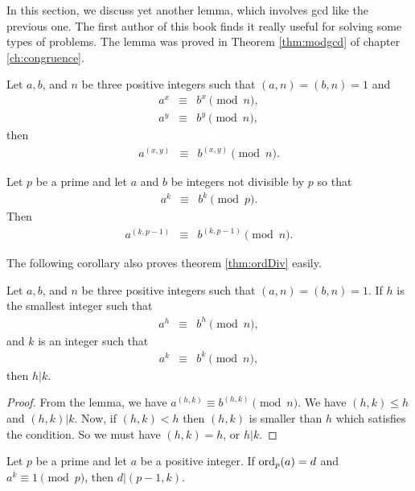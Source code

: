 \documentclass{subfile}
\begin{document}
	In this section, we discuss yet another lemma, which involves gcd like the previous one. The first author of this book finds it really useful for solving some types of problems. The lemma was proved in Theorem \eqref{thm:modgcd} of chapter \eqref{ch:congruence}.
		\begin{lemma}
			Let $a, b$, and $n$ be three positive integers such that $(a,n)=(b,n)=1$ and
				\begin{eqnarray*}
					a^x &\equiv& b^x\pmod n,\\
					a^y &\equiv& b^y\pmod n,
				\end{eqnarray*}
			then
				\begin{eqnarray*}
					a^{(x,y)} &\equiv& b^{(x,y)}\pmod n.
				\end{eqnarray*}
		\end{lemma}
		
		\begin{corollary}
			Let $p$ be a prime and let $a$ and $b$ be integers not divisible by $p$ so that
				\begin{eqnarray*}
					a^k &\equiv& b^k\pmod p.
				\end{eqnarray*}
			Then
				\begin{eqnarray*}
					a^{(k,p-1)} &\equiv& b^{(k,p-1)}\pmod n.
				\end{eqnarray*}
		\end{corollary}
		
	The following corollary also proves theorem \eqref{thm:ordDiv} easily.
		\begin{corollary}
			Let $a, b$, and $n$ be three positive integers such that $(a,n)=(b,n)=1$. If $h$ is the smallest integer such that
				\begin{eqnarray*}
					a^h &\equiv& b^h\pmod n,
				\end{eqnarray*}
			and $k$ is an integer such that	
				\begin{eqnarray*}
					a^k &\equiv& b^k\pmod n,
				\end{eqnarray*}
			then $h|k$.
		\end{corollary}
		
		\begin{proof}
			From the lemma, we have $a^{(h,k)}\equiv b^{(h,k)}\pmod n$. We have $(h,k)\leq h$ and $(h,k)|k$. Now, if $(h,k)<h$ then $(h,k)$ is smaller than $h$ which satisfies the condition. So we must have $(h,k)=h$, or $h|k$.
		\end{proof}
		
		\begin{corollary}\label{cor:cor2}
			Let $p$ be a prime and let $a$ be a positive integer. If $\operatorname{ord}_p(a)=d$ and $a^k\equiv1\pmod p$, then $d|(p-1,k)$.
		\end{corollary}
		
\end{document}
